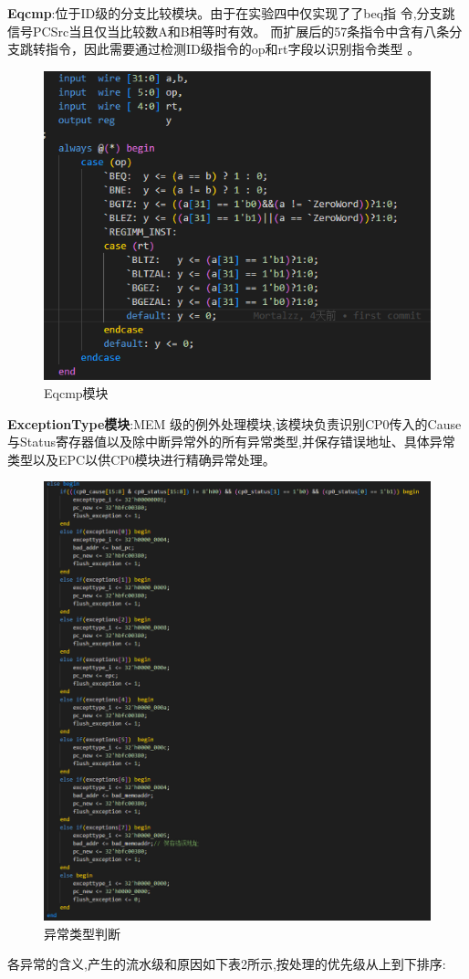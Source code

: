 \textbf{Eqcmp}:位于ID级的分支比较模块。由于在实验四中仅实现了了beq指 令,分支跳信号PCSrc当且仅当比较数A和B相等时有效。 而扩展后的57条指令中含有八条分支跳转指令，因此需要通过检测ID级指令的op和rt字段以识别指令类型 。

\begin{figure}
\centering
\includegraphics[width=0.5\linewidth]{image/p4.png}
\caption{Eqcmp模块}
\label{fig:enter-label}
\end{figure}

\textbf{ExceptionType模块}:MEM 级的例外处理模块,该模块负责识别CP0传入的Cause与Status寄存器值以及除中断异常外的所有异常类型,并保存错误地址、具体异常类型以及EPC以供CP0模块进行精确异常处理。 
\begin{figure}
\centering
\includegraphics[width=0.5\linewidth]{image/p5.png}
\caption{异常类型判断}
\label{fig:enter-label}
\end{figure}

各异常的含义,产生的流水级和原因如下表2所示,按处理的优先级从上到下排序:


